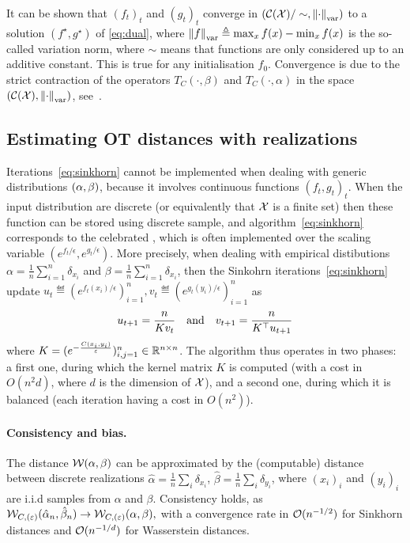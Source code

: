 It can be shown that ${(f_t)}_t$ and ${(g_t)}_t$ converge in $(\mathcal{C}(\mathcal{X})/\sim,
\left\| \cdot \right\|_{\text{var}})$ to a solution $(f^\star, g^\star)$ of
\eqref{eq:dual}, where $\left\| f \right\|_{\text{var}} \triangleq \max_x f(x) - \min_x f(x)$ is
the so-called variation norm, where $\sim$ means that functions are only considered up to an additive constant. This is true for any initialisation $f_0$.  Convergence is due to the strict contraction of the operators $T_C(\cdot, \beta)$ and
$T_{C}(\cdot, \alpha)$ in the space $(\mathcal{C}(\mathcal{X}), \left\| \cdot \right\|_{\text{var}})$, see~\cite{peyre2019computational}.

\subsection{Estimating OT distances with realizations}

Iterations~\eqref{eq:sinkhorn} cannot be implemented when dealing with generic distributions $(\alpha,\beta)$, because it involves continuous functions ${(f_t,g_t)}_t$. 
%
When the input distribution are discrete (or equivalently that $\mathcal{X}$ is a finite
set) then these function can be stored using discrete sample, and
algorithm~\eqref{eq:sinkhorn} corresponds to the celebrated
\citet{sinkhorn1967concerning}, which is often implemented over the scaling
variable $(e^{f_t/\epsilon},e^{g_t/\epsilon})$.
%
More precisely, when dealing with empirical distibutions $\alpha =
\frac{1}{n}\sum_{i=1}^n \delta_{x_i}$ and $\beta = \frac{1}{n} \sum_{i=1}^n
\delta_{x_i}$, then the Sinkohrn iterations~\eqref{eq:sinkhorn} update $u_t \eqdef
(e^{f_t(x_i)/\epsilon})_{i=1}^n, v_t \eqdef (e^{g_t(y_i)/\epsilon})_{i=1}^n$ as
\begin{equation*}
	u_{t+1} = \frac{n}{ K v_t }
	\quad \text{and} \quad
	v_{t+1} = \frac{n}{ K^\top u_{t+1} }
\end{equation*}
where $K=(e^{-\frac{C(x_i,y_i)}{\varepsilon}})_{i,j=1}^n \in \mathbb{R}^{n \times n}$. The algorithm thus operates in two
phases: a first one, during which the kernel matrix $K$ is computed (with a cost
in $O(n^2 d)$, where $d$ is the dimension of $\mathcal{X}$), and a second one, during
which it is balanced (each iteration having a cost in $O(n^2)$).


\paragraph{Consistency and bias.} The distance $\mathcal{W}(\alpha,\beta)$ can be
approximated by the (computable) distance between discrete realizations $\hat
\alpha = \frac{1}{n} \sum_i \delta_{x_i}$, $\hat \beta = \frac{1}{n} \sum_i
\delta_{y_i}$, where $(x_i)_i$ and $(y_i)_i$ are i.i.d samples from $\alpha$ and
$\beta$.  Consistency holds, as $\mathcal{W}_{C, (\varepsilon)}(\hat \alpha_n, \hat
\beta_n) \to \mathcal{W}_{C, (\varepsilon)}(\alpha, \beta),$ with a convergence rate in
$\mathcal{O}(n^{-1/2})$ for Sinkhorn distances and $\mathcal{O}(n^{-1/d})$ for Wasserstein
distances. 

